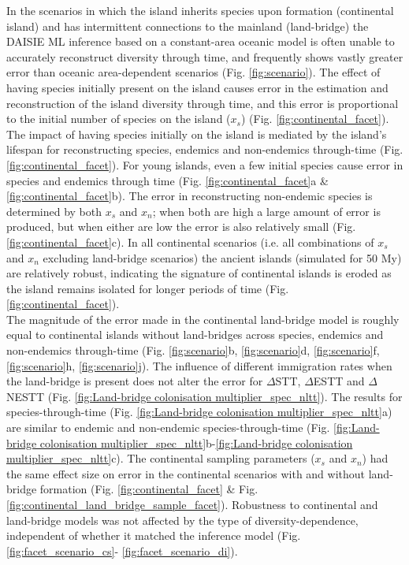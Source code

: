 \documentclass{article}
\begin{document}
In the scenarios in which the island inherits species upon formation (continental island) and has intermittent connections to the mainland (land-bridge) the DAISIE ML inference based on a constant-area oceanic model is often unable to accurately reconstruct diversity through time, and frequently shows vastly greater error than oceanic area-dependent scenarios (Fig. \ref{fig:scenario}). The effect of having species initially present on the island causes error in the estimation and reconstruction of the island diversity through time, and this error is proportional to the initial number of species on the island ($x_s$) (Fig. \ref{fig:continental_facet}). The impact of having species initially on the island is mediated by the island’s lifespan for reconstructing species, endemics and non-endemics through-time (Fig. \ref{fig:continental_facet}). For young islands, even a few initial species cause error in species and endemics through time (Fig. \ref{fig:continental_facet}a \& \ref{fig:continental_facet}b). The error in reconstructing non-endemic species is determined by both $x_s$ and $x_n$; when both are high a large amount of error is produced, but when either are low the error is also relatively small (Fig. \ref{fig:continental_facet}c). In all continental scenarios (i.e. all combinations of $x_s$ and $x_n$ excluding land-bridge scenarios) the ancient islands (simulated for 50 My) are relatively robust, indicating the signature of continental islands is eroded as the island remains isolated for longer periods of time (Fig. \ref{fig:continental_facet}). \\

The magnitude of the error made in the continental land-bridge model is roughly equal to continental islands without land-bridges across species, endemics and non-endemics through-time (Fig. \ref{fig:scenario}b, \ref{fig:scenario}d, \ref{fig:scenario}f,  \ref{fig:scenario}h, \ref{fig:scenario}j). The influence of different immigration rates when the land-bridge is present does not alter the error for $\Delta$STT, $\Delta$ESTT and $\Delta$NESTT (Fig. \ref{fig:Land-bridge colonisation multiplier_spec_nltt}). The results for species-through-time (Fig. \ref{fig:Land-bridge colonisation multiplier_spec_nltt}a) are similar to endemic and non-endemic species-through-time (Fig. \ref{fig:Land-bridge colonisation multiplier_spec_nltt}b-\ref{fig:Land-bridge colonisation multiplier_spec_nltt}c). The continental sampling parameters ($x_s$ and $x_n$) had the same effect size on error in the continental scenarios with and without land-bridge formation (Fig. \ref{fig:continental_facet} \& Fig. \ref{fig:continental_land_bridge_sample_facet}). Robustness to continental and land-bridge models was not affected by the type of diversity-dependence, independent of whether it matched the inference model (Fig. \ref{fig:facet_scenario_cs}- \ref{fig:facet_scenario_di}). \\
\end{document}
